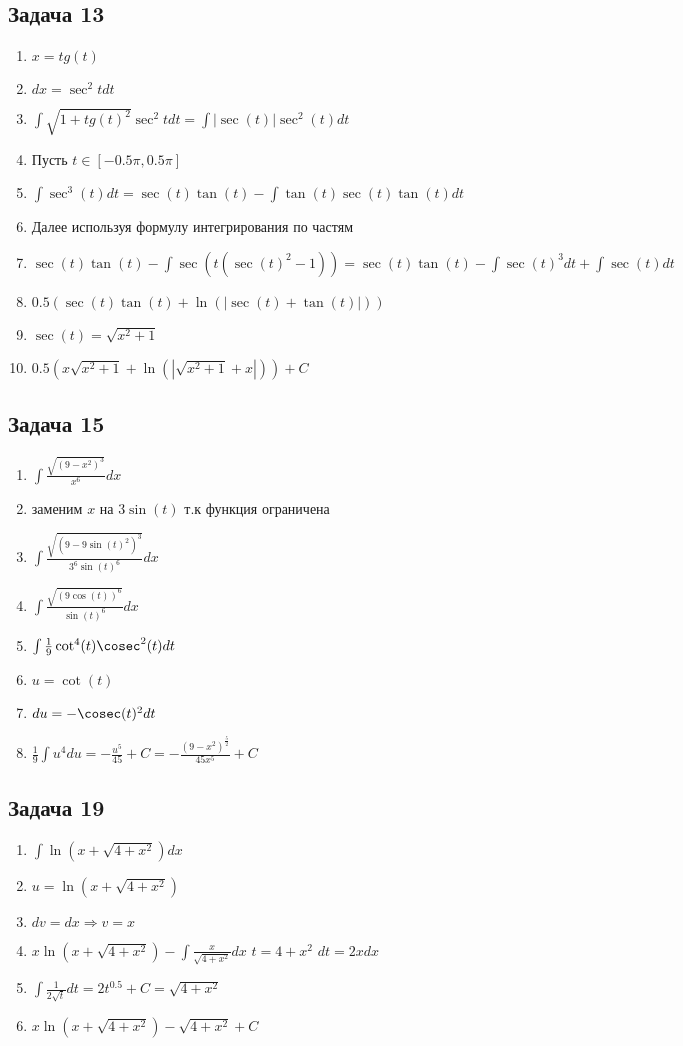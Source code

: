 \documentclass[a4paper,12pt]{article}
\begin{document}
\subsection{Задача 13}
\begin{enumerate}
    \item $x = tg(t)$
    \item $dx = \sec^2t dt$
    \item $\int \sqrt{1+tg(t)^2}\sec^2t dt = \int |\sec(t)|\sec^2(t) dt$
    \item Пусть $t \in [-0.5\pi, 0.5\pi ]$
    \item $\int \sec^3(t) dt = \sec(t)\tan(t)  - \int \tan(t) \sec(t) \tan(t) dt$
    \item Далее используя формулу интегрирования по частям
    \item $\sec(t)\tan(t) - \int \sec(t(\sec(t)^2-1)) = \sec(t)\tan(t) - \int \sec(t)^3 dt + \int \sec(t) dt$
    \item $0.5 (\sec(t)\tan(t) + \ln(|\sec(t) + \tan(t)|))$
    \item $\sec(t) = \sqrt{x^2+1}$
    \item $0.5 (x\sqrt{x^2+1} + \ln(|\sqrt{x^2+1} + x|))+C$
\end{enumerate}

\subsection{Задача 15}
\begin{enumerate}
    \item $\int \frac{\sqrt{(9-x^2)^3}}{x^6}dx$
    \item заменим $x$ на $3\sin(t)$ т.к функция ограничена
    \item $\int \frac{\sqrt{(9-9\sin(t)^2)^3}}{3^6\sin(t)^6}dx$
    \item $\int \frac{\sqrt{(9\cos(t))^6}}{\sin(t)^6}dx$
    \item $\int \frac{1}{9}\cot^4(t)\cosec^2(t)dt$
    \item $u = \cot(t)$
    \item $du = -\cosec(t)^2dt$
    \item $\frac{1}{9}\int u^4du = -\frac{u^5}{45}+C = -\frac{(9-x^2)^{\frac{5}{2}}}{45x^5}+C$
\end{enumerate}

\subsection{Задача 19}
\begin{enumerate}
    \item $\int \ln(x+\sqrt{4+x^2})dx$
    \item $u = \ln(x + \sqrt{4 + x ^ 2})$
    \item $dv = dx \Rightarrow v=x$
    \item $x\ln(x+\sqrt{4+x^2})-\int \frac{x}{\sqrt{4+x^2}}dx$  $t=4+x^2$  $dt = 2xdx $
    \item $\int \frac{1}{2\sqrt{t}}dt = 2t^{0.5}+C = \sqrt{4+x^2}$
    \item $x\ln(x+\sqrt{4+x^2})-\sqrt{4+x^2}+C$
\end{enumerate}
\end{document}
